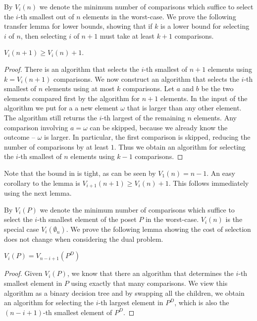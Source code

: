 \documentclass[twoside,leqno,twocolumn]{article}
\newcommand{\dual}[1]{{#1}^{D}}
\begin{document}
By $V_i(n)$ we denote the minimum number of comparisons which suffice to select the $i$-th smallest out of $n$ elements in the worst-case.
We prove the following transfer lemma for lower bounds, showing that if $k$ is a lower bound for selecting $i$ of $n$, then selecting $i$ of $n + 1$ must take at least $k + 1$ comparisons.

\begin{lemma} \label{lemma:previous_next_poset}
  $V_i(n+1) \ge V_i(n) + 1$.
\end{lemma}

\begin{proof}
  There is an algorithm that selects the $i$-th smallest of $n + 1$ elements using $k = V_i(n+1)$ comparisons.
  We now construct an algorithm that selects the $i$-th smallest of $n$ elements using at most $k$ comparisons.
  Let $a$ and $b$ be the two elements compared first by the algorithm for $n + 1$ elements.
  In the input of the algorithm we put for a a new element $\omega$ that is larger than any other element.
  The algorithm still returns the $i$-th largest of the remaining $n$ elements.
  Any comparison involving $a = \omega$ can be skipped, because we already know the outcome -- $\omega$ is larger.
  In particular, the first comparison is skipped, reducing the number of comparisons by at least $1$.
  Thus we obtain an algorithm for selecting the $i$-th smallest of $n$ elements using $k - 1$ comparisons.
\end{proof}

Note that the bound in  is tight, as can be seen by $V_1(n) = n-1$.
An easy corollary to the lemma is $V_{i+1}(n+1) \ge V_i(n) + 1$.
This follows immediately using the next lemma.

By $V_i(P)$ we denote the minimum number of comparisons which suffice to select the $i$-th smallest element of the poset $P$ in the worst-case.
$V_i(n)$ is the special case $V_i(\emptyset_n)$.
We prove the following lemma showing the cost of selection does not change when considering the dual problem.

\begin{lemma} \label{lemma:dual_poset_allowed}
  $V_i(P) = V_{n-i+1}(\dual{P})$
\end{lemma}

\begin{proof}
  Given $V_i(P)$, we know that there an algorithm that determines the $i$-th smallest element in $P$ using exactly that many comparisons.
  We view this algorithm as a binary decision tree and by swapping all the children, we obtain an algorithm for selecting the $i$-th largest element in $\dual{P}$, which is also the $(n-i+1)$-th smallest element of $\dual{P}$.
\end{proof}
\end{document}
